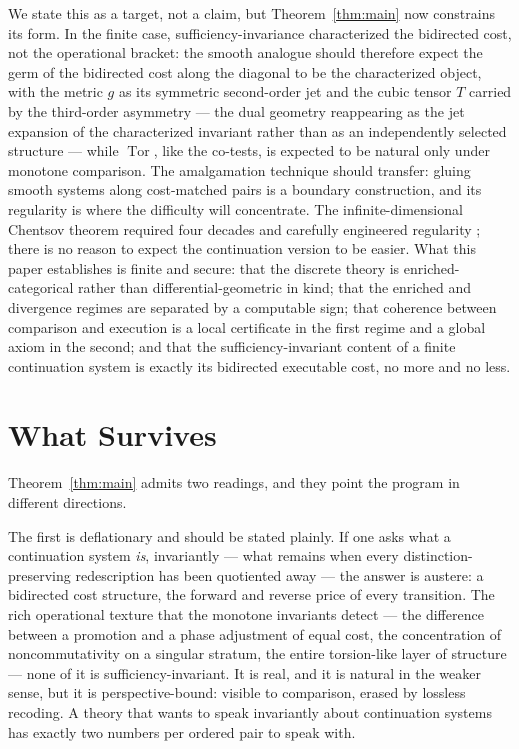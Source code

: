 \documentclass[11pt]{article}
\theoremstyle{remark}
\newcommand{\Tor}{\operatorname{Tor}}
\begin{document}
We state this as a target, not a claim, but
Theorem~\ref{thm:main} now constrains its form. In the finite case,
sufficiency-invariance characterized the bidirected cost, not the
operational bracket: the smooth analogue should therefore expect the
germ of the bidirected cost along the diagonal to be the
characterized object, with the metric $g$ as its symmetric
second-order jet and the cubic tensor $T$ carried by the third-order
asymmetry --- the dual geometry reappearing as the jet expansion of
the characterized invariant rather than as an independently selected
structure --- while $\Tor$, like the co-tests, is expected to be
natural only under monotone comparison. The amalgamation technique
should transfer: gluing smooth systems along cost-matched pairs is a
boundary construction, and its regularity is where the difficulty
will concentrate. The infinite-dimensional Chentsov theorem required
four decades and carefully engineered regularity \cite{ajls}; there
is no reason to expect the continuation version to be easier. What
this paper establishes is finite and secure: that the discrete
theory is enriched-categorical rather than differential-geometric in
kind; that the enriched and divergence regimes are separated by a
computable sign; that coherence between comparison and execution is a
local certificate in the first regime and a global axiom in the
second; and that the sufficiency-invariant content of a finite
continuation system is exactly its bidirected executable cost, no
more and no less.

\section{What Survives}

Theorem~\ref{thm:main} admits two readings, and they point the
program in different directions.

The first is deflationary and should be stated plainly. If one asks
what a continuation system \emph{is}, invariantly --- what remains
when every distinction-preserving redescription has been quotiented
away --- the answer is austere: a bidirected cost structure, the
forward and reverse price of every transition. The rich operational
texture that the monotone invariants detect --- the difference
between a promotion and a phase adjustment of equal cost, the
concentration of noncommutativity on a singular stratum, the entire
torsion-like layer of structure --- none of it is
sufficiency-invariant. It is real, and it is natural in the weaker
sense, but it is perspective-bound: visible to comparison, erased by
lossless recoding. A theory that wants to speak invariantly about
continuation systems has exactly two numbers per ordered pair to
speak with.
\end{document}
